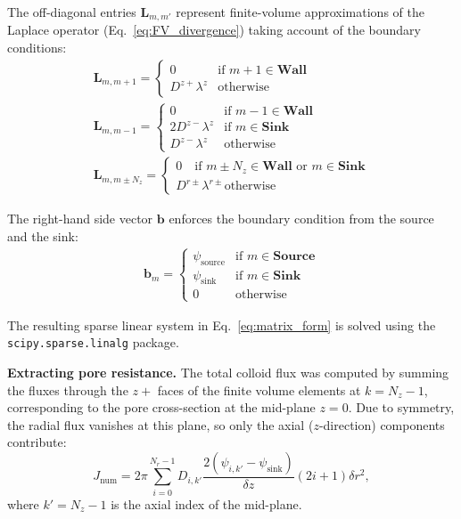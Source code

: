 \documentclass[10pt, a4paper, twocolumn]{article}
\begin{document}
The off-diagonal entries $\bm{L}_{m,m'}$ represent finite-volume approximations of the Laplace operator (Eq.~\eqref{eq:FV_divergence}) taking account of the boundary conditions:
\begin{eqnarray}
    \bm{L}_{m,m+1} =
    \begin{cases}
        0 &  \text{if } m+1 \in \textbf{Wall} \\
        D^{z+} \lambda^{z} &  \text{otherwise}
    \end{cases}
    \\
    \bm{L}_{m,m-1} =
    \begin{cases}
        0 &  \text{if } m-1 \in \textbf{Wall} \\
        2 D^{z-} \lambda^{z} & \text{if } m \in \textbf{Sink}\\
        D^{z-} \lambda^{z} &  \text{otherwise}
    \end{cases}
    \\
    \bm{L}_{m,m \pm N_z} =
    \begin{cases}
        0 \quad \text{if } m \pm N_z \in \textbf{Wall} \text{ or } m \in \textbf{Sink} \\
        D^{r\pm} \lambda^{r\pm}  \text{otherwise}
    \end{cases}
\end{eqnarray}

The right-hand side vector $\bm{b}$ enforces the boundary condition from the source and the sink:
\begin{eqnarray}
    \bm{b}_m = 
    \begin{cases}
        \psi_{\text{source}} & \text{if } m \in \textbf{Source} \\
        \psi_{\text{sink}} & \text{if } m \in \textbf{Sink} \\
        0 & \text{otherwise}
    \end{cases}
\end{eqnarray}

The resulting sparse linear system in Eq.~\eqref{eq:matrix_form} is solved using the \texttt{scipy.sparse.linalg} package.


\bigskip\noindent
\textbf{Extracting pore resistance.}
The total colloid flux was computed by summing the fluxes through the $z+$ faces of the finite volume elements at $k = N_z - 1$, corresponding to the pore cross-section at the mid-plane $z = 0$.
Due to symmetry, the radial flux vanishes at this plane, so only the axial ($z$-direction) components contribute:
\begin{equation}
    J_{\text{num}} = 2\pi \sum_{i=0}^{N_r-1} D_{i,k'} \frac{2(\psi_{i,k'} - \psi_{\text{sink}})}{\delta z} (2i + 1) \delta r^2,
\end{equation}
where $k' = N_z - 1$ is the axial index of the mid-plane.
\end{document}
